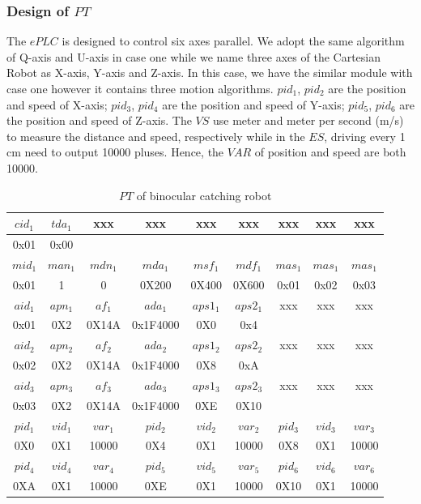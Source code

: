 \documentclass[journal,UTF8]{IEEEtran}
\begin{document}
\subsubsection{Design of $PT$}
The $ePLC$ is designed to control six axes parallel. We adopt the same algorithm of Q-axis and U-axis in case one while we name three axes of the Cartesian Robot as X-axis, Y-axis and Z-axis. In this case, we have the similar module with case one however it contains three motion algorithms. $pid_1$, $pid_2$ are the position and speed of X-axis; $pid_3$, $pid_4$ are the position and speed of Y-axis; $pid_5$, $pid_6$ are the position and speed of Z-axis. The $VS$ use meter and meter per second (m/s) to measure the distance and speed, respectively while in the $ES$, driving every 1 cm need to output 10000 pluses. Hence, the $VAR$ of position and speed are both 10000.    
\begin{table}
	\scriptsize \caption{$PT$ of binocular catching robot}
	\label{table:PTofRobot}
	\begin{center}
		\renewcommand{\arraystretch}{1.4}
		\setlength\tabcolsep{3pt}
		\begin{tabular}{|c|c|c|c|c|c|c|c|c|}
			\hline
			$cid_1$  & $tda_1$   &xxx &xxx& xxx  &xxx &xxx&xxx&xxx \\
			\hline
			0x01&0x00&& &&&&&\\
			\hline
			$mid_1$  &$man_1$&$mdn_1$&$mda_1$&$msf_1$&$mdf_1$&$mas_1$&$mas_1$&$mas_1$\\
			\hline
			0x01     &1     &   0    &0X200  &0X400  & 0X600 &0x01   &0x02   &0x03 \\
			\hline
			$aid_1$  & $apn_1$& $af_1$ &$ada_1$ &$aps1_1$  &$aps2_1$&xxx&xxx&xxx\\
			\hline
			0x01     & 0X2    & 0X14A  &0x1F4000 &0X0   &0x4 &&&\\
			\hline
			$aid_2$  & $apn_2$& $af_2$ &$ada_2$ &$aps1_2$  &$aps2_2$&xxx&xxx&xxx\\
			\hline
			0x02     & 0X2    & 0X14A  &0x1F4000&0X8       &0xA &&&\\
			\hline
			$aid_3$  & $apn_3$& $af_3$ &$ada_3$ &$aps1_3$  &$aps2_3$&xxx&xxx&xxx\\
			\hline
			0x03     & 0X2    & 0X14A  &0x1F4000&0XE       &0X10 &&&\\
			\hline
			$pid_1$  &$vid_1$ &$var_1$ &$pid_2$ &$vid_2$&$var_2$ &$pid_3$&$vid_3$&$var_3$\\
			\hline
			0X0      & 0X1    & 10000  &0X4     &0X1    & 10000  &0X8      & 0X1    & 10000\\
			\hline
			$pid_4$  &$vid_4$ &$var_4$ &$pid_5$ &$vid_5$&$var_5$ &$pid_6$  &$vid_6$ &$var_6$\\
			\hline
			0XA      & 0X1    & 10000  &0XE     &0X1    & 10000  &0X10     & 0X1    & 10000\\
			\hline
		\end{tabular}
	\end{center}
\end{table}
\end{document}
